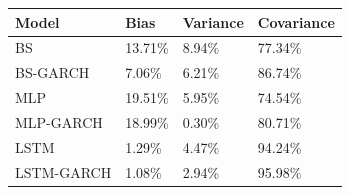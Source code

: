 \begin{tabular}{llll}
\toprule
Model & Bias & Variance & Covariance \\
\midrule
BS & 13.71\% & 8.94\% & 77.34\% \\
BS-GARCH & 7.06\% & 6.21\% & 86.74\% \\
MLP & 19.51\% & 5.95\% & 74.54\% \\
MLP-GARCH & 18.99\% & 0.30\% & 80.71\% \\
LSTM & 1.29\% & 4.47\% & 94.24\% \\
LSTM-GARCH & 1.08\% & 2.94\% & 95.98\% \\
\bottomrule
\end{tabular}
